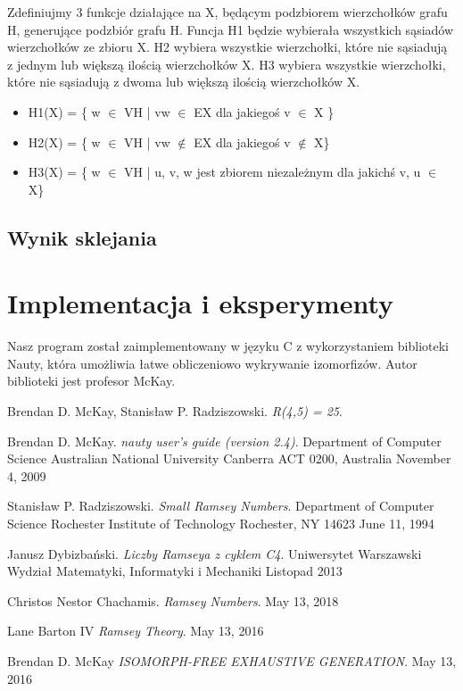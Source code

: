 \documentclass[11pt]{article}
\begin{document}
Zdefiniujmy 3 funkcje działające na X, będącym podzbiorem wierzchołków grafu H, generujące podzbiór grafu H. 
Funcja H1 będzie wybierała wszystkich sąsiadów wierzchołków ze zbioru X.
H2 wybiera wszystkie wierzchołki, które nie sąsiadują z jednym lub większą ilością wierzchołków X. 
H3 wybiera wszystkie wierzchołki, które nie sąsiadują z dwoma lub większą ilością wierzchołków X.
\begin{itemize}
    
  \item   H1(X) = \{ w $\in$ VH | vw $\in$ EX dla jakiegoś v $\in$ X \} 
  
  \item   H2(X) = \{ w $\in$ VH | vw $\notin$ EX dla jakiegoś v $\notin$ X\}
  
  \item   H3(X) = \{ w $\in$ VH | { u, v, w } jest zbiorem niezależnym dla jakichś v, u $\in$ X\} 
  
\end{itemize}

\subsection{Wynik sklejania}


\section{Implementacja i eksperymenty}
Nasz program został zaimplementowany w języku C z wykorzystaniem biblioteki Nauty, która umożliwia łatwe obliczeniowo wykrywanie izomorfizów.
Autor biblioteki jest profesor McKay. 

\begin{thebibliography}{9}
  Brendan D. McKay, Stanisław P. Radziszowski. 
  \textit{R(4,5) = 25}. 
  
  Brendan D. McKay.
  \textit{nauty user's guide (version 2.4)}.  
  Department of Computer Science
  Australian National University
  Canberra ACT 0200, Australia
  November 4, 2009

  Stanisław P. Radziszowski.
  \textit{Small Ramsey Numbers}.  
  Department of Computer Science Rochester Institute of Technology Rochester, NY 14623
  June 11, 1994

  Janusz Dybizbański.
  \textit{Liczby Ramseya z cyklem C4}.  
  Uniwersytet Warszawski
  Wydział Matematyki, Informatyki i Mechaniki
  Listopad 2013

  Christos Nestor Chachamis.
  \textit{Ramsey Numbers}.  
  May 13, 2018

  Lane Barton IV
  \textit{Ramsey Theory}.  
  May 13, 2016

  Brendan D. McKay
  \textit{ISOMORPH-FREE EXHAUSTIVE GENERATION}.  
  May 13, 2016

  \end{thebibliography}
\end{document}
